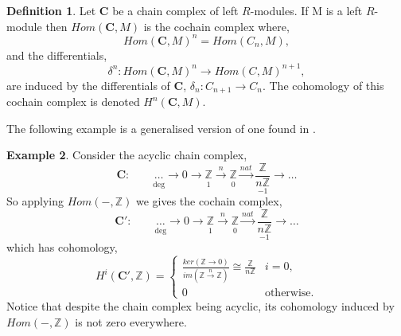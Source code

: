 \documentclass[11.5pt, twoside, a4paper, titlepage]{report}
\providecommand{\equ}[0]{\begin{equation*}}
\providecommand{\eequ}[0] {\end{equation*}}
\providecommand{\bb}[1]{\mathbb{#1}}
\theoremstyle{definition}
\newtheorem{mydef}{Definition}[section]
\newtheorem{eg}[mydef]{Example}
\theoremstyle{plain}
\begin{document}
\begin{mydef}
Let $\mathbf{C}$ be a chain complex of left $R$-modules. If M is a left $R$-module then \emph{$Hom(\mathbf{C}, M)$} is the cochain complex where,
\equ
Hom(\mathbf{C}, M)^n=Hom(C_n, M),
\eequ
and the differentials, 
\equ
\delta^n: Hom(\mathbf{C}, M)^n \to Hom(C, M)^{n+1},
\eequ
are induced by the differentials of $\mathbf{C}$, $\delta_n:C_{n+1}\to C_n$. The cohomology of this cochain complex is denoted $H^n(\mathbf{C}, M)$.
\end{mydef}

The following example is a generalised version of one found in \cite{CB1}.

\begin{eg}
Consider the acyclic chain complex, 
\equ
\mathbf{C}: \qquad \underset{\text{deg}}{\underset{}{\dots}} \xrightarrow{}0 \xrightarrow{} \underset{1}{\underset{}{\bb{Z}}} \xrightarrow{n} \underset{0}{\underset{}{\bb{Z}}} \xrightarrow{nat} \underset{-1}{\frac{\bb{Z}}{n\bb{Z}}} \xrightarrow{} \dots
\eequ
So applying $Hom(-, \bb{Z})$ we gives the cochain complex, 
\equ
\mathbf{C'}: \qquad \underset{\text{deg}}{\underset{}{\dots}} \xrightarrow{}0 \xrightarrow{} \underset{1}{\underset{}{\bb{Z}}} \xrightarrow{n} \underset{0}{\underset{}{\bb{Z}}} \xrightarrow{nat} \underset{-1}{\frac{\bb{Z}}{n\bb{Z}}} \xrightarrow{} \dots
\eequ
which has cohomology,
\equ
H^i(\mathbf{C'}, \bb{Z})=
\begin{cases}
\frac{ker(\bb{Z}\to0)}{im(\bb{Z}\xrightarrow{n}\bb{Z})} \cong \frac{\bb{Z}}{n\bb{Z}} & i=0, \\
0 & \text{otherwise.}
\end{cases}
\eequ
Notice that despite the chain complex being acyclic, its cohomology induced by $Hom(-, \bb{Z})$  is not zero everywhere.
\end{eg}
\end{document}
